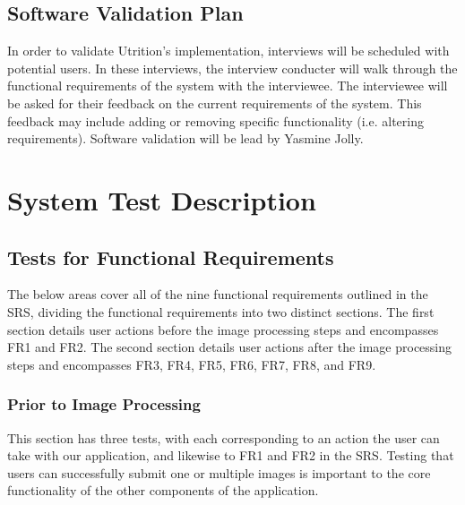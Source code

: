 \documentclass[12pt, titlepage]{article}
\begin{document}
	\subsection{Software Validation Plan}
	
	
	
	
	In order to validate Utrition's implementation, interviews will be scheduled with potential users. In these interviews, the interview conducter will walk through the functional requirements of the system with the interviewee. The interviewee will be asked for their feedback on the current requirements of the system. This feedback may include adding or removing specific functionality (i.e. altering requirements). Software validation will be lead by Yasmine Jolly. 
	
	\section{System Test Description}
	
	\subsection{Tests for Functional Requirements}
	The below areas cover all of the nine functional requirements outlined in the SRS, dividing the functional requirements into two distinct sections. The first section details user actions before the image processing steps and encompasses FR1 and FR2. The second section details user actions after the image processing steps and encompasses FR3, FR4, FR5, FR6, FR7, FR8, and FR9.
	
	\subsubsection{Prior to Image Processing}
	This section has three tests, with each corresponding to an action the user 
	can take with our application, and likewise to FR1 and FR2 in the SRS. 
	Testing that users can successfully submit one or multiple images is 
	important to the core functionality of the other components of the 
	application.
	
\end{document}
